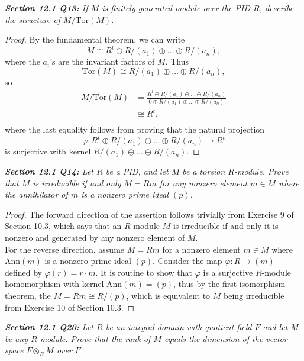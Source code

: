 \documentclass{article}
\begin{document}
\it \textbf{Section 12.1 Q13:} If $M$ is finitely generated module over the
  PID $R$, describe the structure of $M/\text{Tor}(M)$.
  \begin{proof}
    By the fundamental theorem, we can write
    \[M\cong R^t \oplus R/(a_1)\oplus\ldots \oplus R/(a_n),\]
    where the $a_i$'s are the invariant factors of $M$. Thus
    \[\text{Tor}(M) \cong R/(a_1)\oplus\ldots \oplus R/(a_n),\]
    so
    \begin{align*}
      M/\text{Tor}(M) &=\frac{R^t \oplus R/(a_1)\oplus\ldots \oplus R/(a_n)}
        {0\oplus R/(a_1)\oplus\ldots \oplus R/(a_n)}\\
      &\cong R^t,\\
    \end{align*}
    where the last equality follows from proving that the natural
    projection \[\varphi:R^t \oplus R/(a_1)\oplus\ldots \oplus R/(a_n)
    \rightarrow R^t\] is surjective with kernel $R/(a_1)\oplus\ldots \oplus
    R/(a_n)$.
  \end{proof}

\it \textbf{Section 12.1 Q14:} Let $R$ be a PID, and let $M$ be a torsion
  $R$-module. Prove that $M$ is irreducible if and only $M=Rm$ for any
  nonzero element $m\in M$ where the annihilator of $m$ is a nonzero prime
  ideal $(p)$.

  \begin{proof}
    The forward direction of the assertion follows trivially from Exercise
    9 of Section 10.3, which says that an $R$-module $M$ is irreducible if
    and only it is nonzero and generated by any nonzero element of $M$. \\

    For the reverse direction, assume $M=Rm$ for a nonzero element $m\in M$
    where $\text{Ann}(m)$ is a nonzero prime ideal $(p)$. Consider the map
    $\varphi:R\rightarrow(m)$ defined by $\varphi(r)=r\cdot m$. It is
    routine to show that $\varphi$ is a surjective $R$-module homomorphism
    with kernel $\text{Ann}(m)=(p)$, thus by the first isomorphism theorem,
    the $M=Rm\cong R/(p)$, which is equivalent to $M$ being irreducible
    from Exercise 10 of Section 10.3.
  \end{proof}

\it \textbf{Section 12.1 Q20:} Let $R$ be an integral domain with quotient
  field $F$ and let $M$ be any $R$-module. Prove that the rank of $M$
  equals the dimension of the vector space $F\otimes_RM$ over $F$.
\end{document}
